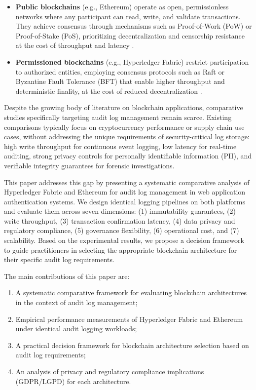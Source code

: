\documentclass[12pt,a4paper]{article}
\begin{document}
\begin{itemize}
    \item \textbf{Public blockchains} (e.g., Ethereum) operate as open, permissionless networks where any participant can read, write, and validate transactions. They achieve consensus through mechanisms such as Proof-of-Work (PoW) or Proof-of-Stake (PoS), prioritizing decentralization and censorship resistance at the cost of throughput and latency \cite{ethereum2024}.
    \item \textbf{Permissioned blockchains} (e.g., Hyperledger Fabric) restrict participation to authorized entities, employing consensus protocols such as Raft or Byzantine Fault Tolerance (BFT) that enable higher throughput and deterministic finality, at the cost of reduced decentralization \cite{hyperledger2024}.
\end{itemize}

Despite the growing body of literature on blockchain applications, comparative studies specifically targeting audit log management remain scarce. Existing comparisons typically focus on cryptocurrency performance or supply chain use cases, without addressing the unique requirements of security-critical log storage: high write throughput for continuous event logging, low latency for real-time auditing, strong privacy controls for personally identifiable information (PII), and verifiable integrity guarantees for forensic investigations.

This paper addresses this gap by presenting a systematic comparative analysis of Hyperledger Fabric and Ethereum for audit log management in web application authentication systems. We design identical logging pipelines on both platforms and evaluate them across seven dimensions: (1) immutability guarantees, (2) write throughput, (3) transaction confirmation latency, (4) data privacy and regulatory compliance, (5) governance flexibility, (6) operational cost, and (7) scalability. Based on the experimental results, we propose a decision framework to guide practitioners in selecting the appropriate blockchain architecture for their specific audit log requirements.

The main contributions of this paper are:

\begin{enumerate}
    \item A systematic comparative framework for evaluating blockchain architectures in the context of audit log management;
    \item Empirical performance measurements of Hyperledger Fabric and Ethereum under identical audit logging workloads;
    \item A practical decision framework for blockchain architecture selection based on audit log requirements;
    \item An analysis of privacy and regulatory compliance implications (GDPR/LGPD) for each architecture.
\end{enumerate}
\end{document}
